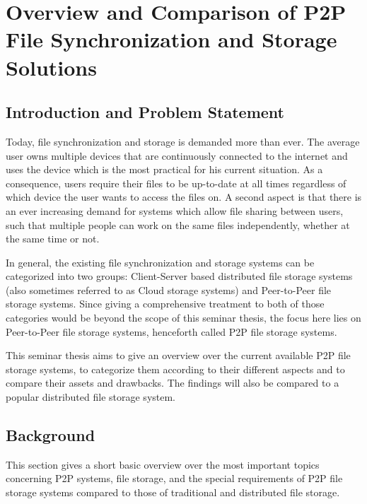 \chapter{Overview and Comparison of P2P File Synchronization and Storage Solutions}


\newpage

\minitoc

\newpage

\section{Introduction and Problem Statement}
Today, file synchronization and storage is demanded more than ever. The average user owns multiple devices that are continuously connected to the internet and uses the device which is the most practical for his current situation. As a consequence, users require their files to be up-to-date at all times regardless of which device the user wants to access the files on. A second aspect is that there is an ever increasing demand for systems which allow file sharing between users, such that multiple people can work on the same files independently, whether at the same time or not.

In general, the existing file synchronization and storage systems can be categorized into two groups: Client-Server based distributed file storage systems (also sometimes referred to as Cloud storage systems) and Peer-to-Peer file storage systems. Since giving a comprehensive treatment to both of those categories would be beyond the scope of this seminar thesis, the focus here lies on Peer-to-Peer file storage systems, henceforth called P2P file storage systems.

This seminar thesis aims to give an overview over the current available P2P file storage systems, to categorize them according to their different aspects and to compare their assets and drawbacks. The findings will also be compared to a popular distributed file storage system.


\section{Background} %
This section gives a short basic overview over the most important topics concerning P2P systems, file storage, and the special requirements of P2P file storage systems compared to those of traditional and distributed file storage.

